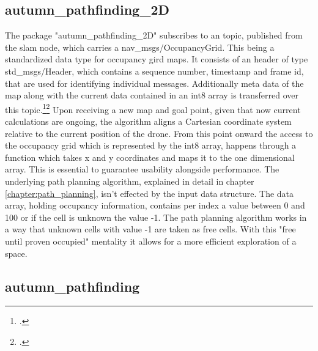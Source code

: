 \subsection{autumn\_pathfinding\_2D}
The package "autumn\_pathfinding\_2D" subscribes to an topic, published from the slam node, which carries a nav\_msgs/OccupancyGrid. This being a standardized data type for occupancy gird maps. It consists of an header of type std\_msgs/Header, which contains a sequence number, timestamp and frame id, that are used for identifying individual messages. Additionally meta data of the map along with the current data contained in an int8 array is transferred over this topic.\footcite{rosNavMsgsOccupancyGrid2021}\footcite{rosStdMsgsHeader2021}\newline
Upon receiving a new map and goal point, given that now current calculations are ongoing, the algorithm aligns a Cartesian coordinate system relative to the current position of the drone. From this point onward the access to the occupancy grid which is represented by the int8 array, happens through a function which takes x and y coordinates and maps it to the one dimensional array. This is essential to guarantee usability alongside performance. The underlying path planning algorithm, explained in detail in chapter \ref{chapter:path_planning}, isn't effected by the input data structure.       
The data array, holding occupancy information, contains per index a value between 0 and 100 or if the cell is unknown the value -1. The path planning algorithm works in a way that unknown cells with value -1 are taken as free cells. With this "free until proven occupied" mentality it allows for a more efficient exploration of a space.

\subsection{autumn\_pathfinding}